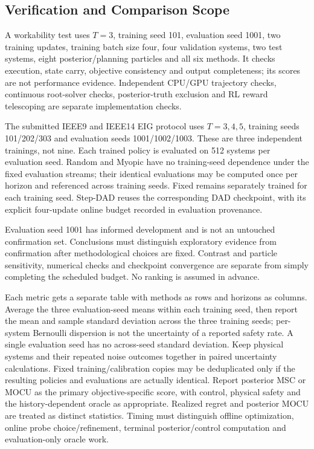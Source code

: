 \documentclass[journal]{IEEEtran}
\begin{document}
\subsection{Verification and Comparison Scope}
A workability test uses $T=3$, training seed 101, evaluation seed 1001,
two training updates, training batch size four, four validation systems, two test systems,
eight posterior/planning particles and all six methods. It checks execution,
state carry, objective consistency and output completeness; its scores are
not performance evidence. Independent CPU/GPU trajectory checks, continuous
root-solver checks, posterior-truth exclusion and RL reward telescoping are
separate implementation checks.

The submitted IEEE9 and IEEE14 EIG protocol uses $T=3,4,5$, training
seeds 101/202/303 and evaluation seeds 1001/1002/1003. These are three
independent trainings, not nine. Each trained policy is evaluated on
512 systems per evaluation seed. Random and Myopic have no training-seed
dependence under the fixed evaluation streams; their identical evaluations
may be computed once per horizon and referenced across training seeds.
Fixed remains separately trained for each training seed. Step-DAD reuses
the corresponding DAD checkpoint, with its explicit four-update online
budget recorded in evaluation provenance.

Evaluation seed 1001 has informed development and is not an untouched
confirmation set. Conclusions must distinguish exploratory evidence from
confirmation after methodological choices are fixed. Contrast and particle
sensitivity, numerical checks and checkpoint convergence are separate from
simply completing the scheduled budget. No ranking is assumed in advance.

Each metric gets a separate table with methods as rows and horizons as columns.
Average the three evaluation-seed means within each training seed, then
report the mean and sample standard deviation across the three training seeds;
per-system Bernoulli dispersion is not the uncertainty of a reported safety
rate. A single evaluation seed has no across-seed standard deviation.
Keep physical systems and their repeated noise outcomes together in paired
uncertainty calculations. Fixed training/calibration copies may be deduplicated
only if the resulting policies and evaluations are actually identical.
Report posterior MSC or MOCU as the primary objective-specific score, with
control, physical safety and the history-dependent oracle as appropriate.
Realized regret and posterior MOCU are treated as distinct statistics. Timing must distinguish
offline optimization, online probe choice/refinement, terminal posterior/control
computation and evaluation-only oracle work.
\end{document}
